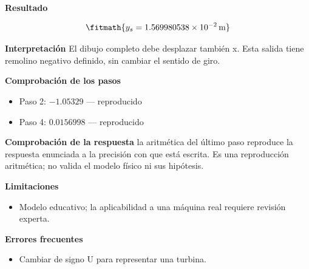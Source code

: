 \documentclass[10pt,openany]{book}
\begin{document}
\begin{tcolorbox}[title={Problema resuelto 4}, studiumworked, breakable]
\noindent\textbf{Resultado}

\[
\fitmath{y_s=1.569980538\times10^{-2}\,\mathrm{m}}
\]

\noindent\textbf{Interpretación}
El dibujo completo debe desplazar también x. Esta salida tiene remolino negativo definido, sin cambiar el sentido de giro.

\noindent\textbf{Comprobación de los pasos}
\begin{itemize}
\item Paso 2: $-1.05329$ — reproducido
\item Paso 4: $0.0156998$ — reproducido
\end{itemize}

\noindent\textbf{Comprobación de la respuesta} la aritmética del último paso reproduce la respuesta enunciada a la precisión con que está escrita. Es una reproducción aritmética; no valida el modelo físico ni sus hipótesis.

\noindent\textbf{Limitaciones}
\begin{itemize}
\item Modelo educativo; la aplicabilidad a una máquina real requiere revisión experta.
\end{itemize}

\noindent\textbf{Errores frecuentes}
\begin{itemize}
\item Cambiar de signo U para representar una turbina.
\end{itemize}
\end{tcolorbox}
\end{document}
